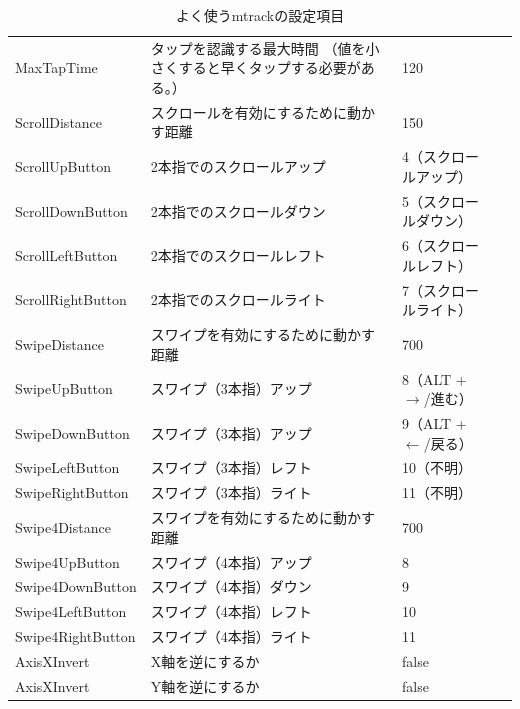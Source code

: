 \documentclass[mingoth,a4paper]{jsarticle}
\begin{document}
\begin{table}[htb]
\begin{tabular}{lp{28em}lc}
    MaxTapTime & タップを認識する最大時間 （値を小さくすると早くタップする必要がある。）& 120 \\
    ScrollDistance & スクロールを有効にするために動かす距離 & 150\\
    ScrollUpButton & 2本指でのスクロールアップ& 4（スクロールアップ）\\
    ScrollDownButton & 2本指でのスクロールダウン & 5（スクロールダウン）\\
    ScrollLeftButton & 2本指でのスクロールレフト& 6（スクロールレフト）\\
    ScrollRightButton & 2本指でのスクロールライト& 7（スクロールライト）\\
    SwipeDistance & スワイプを有効にするために動かす距離 & 700\\
    SwipeUpButton & スワイプ（3本指）アップ & 8（ALT + $\rightarrow$/進む） \\
    SwipeDownButton & スワイプ（3本指）アップ& 9（ALT + $\leftarrow$/戻る） \\
    SwipeLeftButton & スワイプ（3本指）レフト & 10（不明） \\
    SwipeRightButton & スワイプ（3本指）ライト& 11（不明） \\
    Swipe4Distance & スワイプを有効にするために動かす距離 & 700\\
    Swipe4UpButton & スワイプ（4本指）アップ　& 8 \\
    Swipe4DownButton & スワイプ（4本指）ダウン　& 9 \\
    Swipe4LeftButton & スワイプ（4本指）レフト　& 10\\
    Swipe4RightButton & スワイプ（4本指）ライト　& 11\\
    AxisXInvert & X軸を逆にするか & false \\
    AxisXInvert & Y軸を逆にするか & false \\
  \end{tabular}
\caption{よく使うmtrackの設定項目}
\label{fig:mtrack-config}
\end{table}
\end{document}
